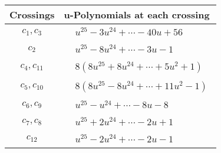 \documentclass[1p]{elsarticle_modified}
\theoremstyle{definition}
\begin{document}
\begin{tabular}{m{50pt}|m{274pt}}
Crossings & \hspace{64pt}u-Polynomials at each crossing \\
\hline $$\begin{aligned}c_{1},c_{3}\end{aligned}$$&$\begin{aligned}
&u^{25}-3 u^{24}+\cdots-40 u+56
\end{aligned}$\\
\hline $$\begin{aligned}c_{2}\end{aligned}$$&$\begin{aligned}
&u^{25}-8 u^{24}+\cdots-3 u-1
\end{aligned}$\\
\hline $$\begin{aligned}c_{4},c_{11}\end{aligned}$$&$\begin{aligned}
&8(8 u^{25}+8 u^{24}+\cdots+5 u^2+1)
\end{aligned}$\\
\hline $$\begin{aligned}c_{5},c_{10}\end{aligned}$$&$\begin{aligned}
&8(8 u^{25}-8 u^{24}+\cdots+11 u^2-1)
\end{aligned}$\\
\hline $$\begin{aligned}c_{6},c_{9}\end{aligned}$$&$\begin{aligned}
&u^{25}- u^{24}+\cdots-8 u-8
\end{aligned}$\\
\hline $$\begin{aligned}c_{7},c_{8}\end{aligned}$$&$\begin{aligned}
&u^{25}+2 u^{24}+\cdots-2 u+1
\end{aligned}$\\
\hline $$\begin{aligned}c_{12}\end{aligned}$$&$\begin{aligned}
&u^{25}-2 u^{24}+\cdots-2 u-1
\end{aligned}$\\
\hline
\end{tabular}\\~\\
\newpage\renewcommand{\arraystretch}{1}
\end{document}

